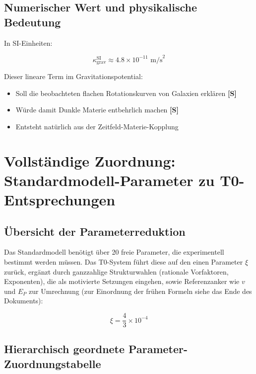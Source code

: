 	\subsection{Numerischer Wert und physikalische Bedeutung}
	
	In SI-Einheiten:
	
	\begin{equation}
		\kappa_{\text{grav}}^{\text{SI}} \approx 4.8 \times 10^{-11} \text{ m/s}^2
	\end{equation}
	
	Dieser lineare Term im Gravitationspotential:
	\begin{itemize}
		\item Soll die beobachteten flachen Rotationskurven von Galaxien erklären \textbf{[S]}
		\item Würde damit Dunkle Materie entbehrlich machen \textbf{[S]}
		\item Entsteht natürlich aus der Zeitfeld-Materie-Kopplung
	\end{itemize}
	
\section{Vollständige Zuordnung: Standardmodell-Parameter zu T0-Entsprechungen}
\label{sec:sm_t0_mapping}

\subsection{Übersicht der Parameterreduktion}
\label{subsec:parameter_overview}

Das Standardmodell benötigt über 20 freie Parameter, die experimentell bestimmt werden müssen. Das T0-System führt diese auf den einen Parameter $\xi$ zurück, ergänzt durch ganzzahlige Strukturwahlen (rationale Vorfaktoren, Exponenten), die als motivierte Setzungen eingehen, sowie Referenzanker wie $v$ und $E_P$ zur Umrechnung (zur Einordnung der frühen Formeln siehe das Ende des Dokuments):

\begin{equation}
	\boxed{\xi = \frac{4}{3} \times 10^{-4}}
\end{equation}

\subsection{Hierarchisch geordnete Parameter-Zuordnungstabelle}
\label{subsec:hierarchical_mapping}

